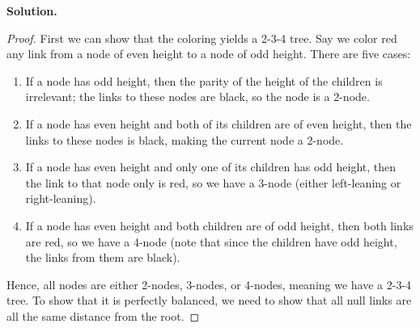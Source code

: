 \documentclass[12pt, a4paper]{article}
\newenvironment{sol}[1][Solution]
{\par\medskip\noindent \textbf{#1.} }
{\medskip}
\begin{document}
	\begin{sol}
		\begin{proof}
			First we can show that the coloring yields a 2-3-4 tree. Say we color
			red any link from a node of even height to a node of odd height.
			There are five cases:
			\begin{enumerate}
				\item If a node has odd height, then the parity of the height of
				the children is irrelevant; the links to these nodes are black,
				so the node is a 2-node.
				\item If a node has even height and both of its children are of
				even height, then the links to these nodes is black, making
				the current node a 2-node.
				\item If a node has even height and only one of its children has
				odd height, then the link to that node only is red, so we have
				a 3-node (either left-leaning or right-leaning).
				\item If a node has even height and both children are of odd height,
				then both links are red, so we have a 4-node (note that since
				the children have odd height, the links from them are black).
			\end{enumerate}
			Hence, all nodes are either 2-nodes, 3-nodes, or 4-nodes, meaning we have
			a 2-3-4 tree. To show that it is perfectly balanced, we need to show
			that all null links are all the same distance from the root.
		\end{proof}
	\end{sol}
	
	\pagebreak
	\printbibliography
\end{document}
